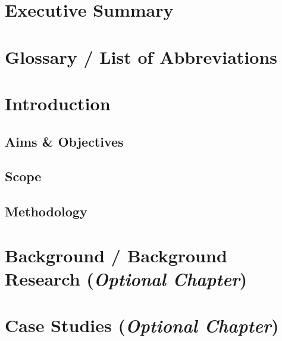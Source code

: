 \documentclass{bcrre_assignment}
\begin{document}

\maketitle

\justifying %

\chapter*{Executive Summary}

\newpage

\tableofcontents
\begingroup \let\clearpage\relax 
\listoffigures
\listoftables
\chapter*{Glossary / List of Abbreviations} 

\endgroup
\chapter{Introduction}  
\parencite{elliott2014} %

\section{Aims \& Objectives}

\section{Scope}

\section{Methodology}

\chapter{Background / Background Research (\textit{Optional Chapter})}

\chapter{Case Studies (\textit{Optional Chapter})}
\end{document}
